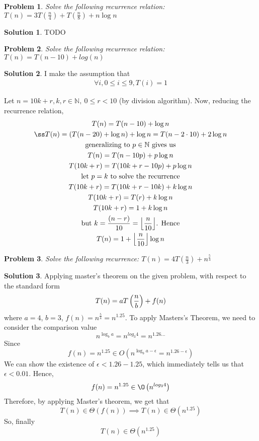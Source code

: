 \documentclass{article}
\newtheorem{problem}{Problem}
\theoremstyle{definition}
\newtheorem*{solution}{Solution}
\DeclarePairedDelimiter\floor{\lfloor}{\rfloor}
\begin{document}
\begin{problem}
Solve the following recurrence relation: $T(n) = 3T(\frac n 4) + T(\frac n 8) + n \log n$
\end{problem}
\begin{solution}
	TODO
\end{solution}

\begin{problem}
Solve the following recurrence relation: $T(n) = T(n - 10) + log(n)$
\end{problem}
\begin{solution}
	I make the assumption that
	\begin{gather*}
		\forall i, 0 \leq i \leq 9, T(i) = 1
	\end{gather*}
	
	Let $n = 10k + r, k, r \in \mathbb N, \ 0 \leq r < 10$ (by division algorithm). Now, reducing the recurrence relation,
	\begin{gather*}
		T(n) = T(n - 10) + \log n \\ß
		T(n) = (T(n - 20) + \log n) + \log n = T(n - 2 \cdot 10) + 2 \log n \\
		\text{generalizing to $p \in \mathbb N$ gives us} \\
		T(n) = T(n - 10p) + p \log n  \\
		T(10k + r) = T(10k + r - 10p) + p \log n \\
		\text{let $p = k$ to solve the recurrence} \\
		T(10k + r) = T(10k + r -10k) + k \log n \\
		T(10k + r) = T(r) + k \log n \\
		T(10k + r) = 1 + k \log n \\
		\text{but $k = \frac{(n - r)}{10} = \floor*{\frac{n}{10}}$. Hence} \\
		T(n) = 1 + \floor*{\frac{n}{10}} \log n
	\end{gather*}
\end{solution}


\begin{problem}
Solve the following recurrence: $T(n) = 4T(\frac n 3) + n^{\frac 5 4}$
\end{problem}
\begin{solution}
	Applying master's theorem on the given problem, with respect to the standard form
	$$
	T(n) = aT \left( \frac{n}{b} \right) + f(n) \\
	$$
	where $a = 4$, $b = 3$, $f(n) = n^{\frac 5 4} = n^{1.25}$.
	To apply Masters's Theorem, we need to consider the comparison value
	$$n^{\log_b a} = n^{log_3 4} = n^{1.26...}$$
	Since
	$$
	f(n) = n^{1.25} \in O(n^{\log_b a - \epsilon} = n^{1.26 - \epsilon})
	$$
	We can show the existence of $\epsilon < 1.26 - 1.25$, which immediately tells us that $\epsilon < 0.01$. Hence,
	$$
	f(n) = n^{1.25} \in \O \left( n^{log_3 4} \right)
	$$
	Therefore, by applying Master's theorem, we get that 
	$$
	T(n) \in \Theta \left( f(n) \right) \implies T(n) \in \Theta \left( n^{1.25} \right)
	$$
	So, finally
	$$
	T(n) \in \Theta \left( n^{1.25} \right)
	$$
\end{solution}
\end{document}

